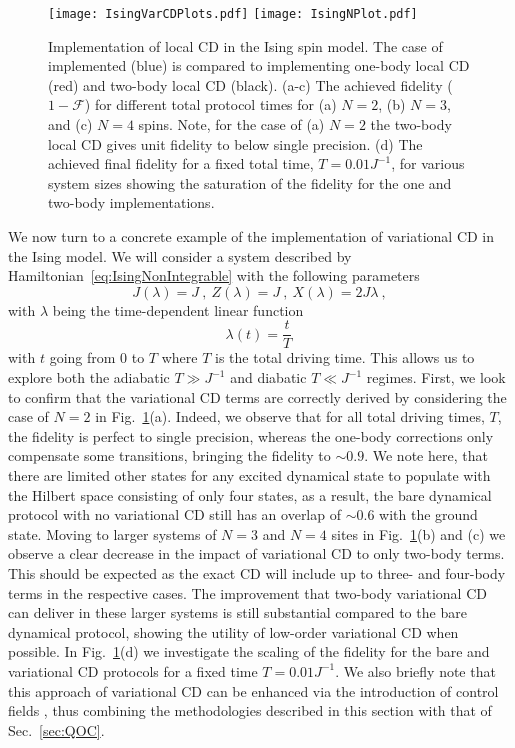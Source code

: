 \begin{figure}[t!]
\texttt{[image: IsingVarCDPlots.pdf]}
\texttt{[image: IsingNPlot.pdf]}
\caption{Implementation of local CD in the Ising spin model. The case of  implemented (blue) is compared to implementing one-body local CD (red) and two-body local CD (black). (a-c) The achieved fidelity ($1-\mathcal{F}$) for different total protocol times for (a) $N=2$, (b) $N=3$, and (c) $N=4$ spins. Note, for the case of (a) $N=2$ the two-body local CD gives unit fidelity to below single precision. (d) The achieved final fidelity for a fixed total time, $T=0.01 J^{-1}$, for various system sizes showing the saturation of the fidelity for the one and two-body implementations.}
\label{fig:figvarcd}
\end{figure}

We now turn to a concrete example of the implementation of variational CD in the Ising model. We will consider a system described by Hamiltonian~\eqref{eq:IsingNonIntegrable} with the following parameters
\begin{equation}
    J(\lambda) = J \ , \: Z(\lambda) = J \ , \: X(\lambda) = 2J\lambda \ , \nonumber
\end{equation}
with $\lambda$ being the time-dependent linear function
\begin{equation}
    \lambda(t) = \frac{t}{T} \,
\end{equation}
with $t$ going from $0$ to $T$ where $T$ is the total driving time. This allows us to explore both the adiabatic $T \gg J^{-1}$ and diabatic $T \ll J^{-1}$ regimes. First, we look to confirm that the variational CD terms are correctly derived by considering the case of $N=2$ in Fig.~\ref{fig:figvarcd}(a). Indeed, we observe that for all total driving times, $T$, the fidelity is perfect to single precision, whereas the one-body corrections only compensate some transitions, bringing the fidelity to $\sim\!0.9$. We note here, that there are limited other states for any excited dynamical state to populate with the Hilbert space consisting of only four states, as a result, the bare dynamical protocol with no variational CD still has an overlap of $\sim\!0.6$ with the ground state. Moving to larger systems of $N=3$ and $N=4$ sites in Fig.~\ref{fig:figvarcd}(b) and (c) we observe a clear decrease in the impact of variational CD to only two-body terms. This should be expected as the exact CD will include up to three- and four-body terms in the respective cases. The improvement that two-body variational CD can deliver in these larger systems is still substantial compared to the bare dynamical protocol, showing the utility of low-order variational CD when possible. In Fig.~\ref{fig:figvarcd}(d) we investigate the scaling of the fidelity for the bare and variational CD protocols for a fixed time $T=0.01J^{-1}$. We also briefly note that this approach of variational CD can be enhanced via the introduction of control fields \cite{COLD_PRXQ, morawetz2024efficient}, thus combining the methodologies described in this section with that of Sec.~\ref{sec:QOC}.

